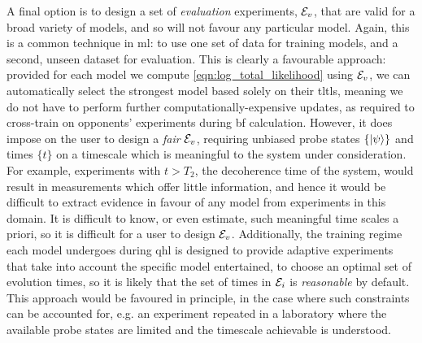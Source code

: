A final option is to design a set of \emph{evaluation} \glspl{experiment}, ${ \mathcal{E} }_v$, 
    that are valid for a broad variety of models, and so will not favour any particular model.
Again, this is a common technique in \gls{ml}: to use one set of data for training models, 
    and a second, unseen dataset for evaluation. 
This is clearly a favourable approach: 
    provided for each model we compute \cref{eqn:log_total_likelihood} using ${ \mathcal{E} }_v$,
    we can automatically select the strongest model based solely on their \glspl{tltl}, 
    meaning we do not have to perform further computationally-expensive updates, 
    as required to cross-train on opponents' 
    \glspl{experiment} during \gls{bf} calculation. 
However, it does impose on the user to design a \emph{fair} ${ \mathcal{E} }_v$, 
    requiring unbiased \gls{probe} states $\{\ket{\psi}\}$ and times $\{t\}$ on a timescale 
    which is meaningful to the system under consideration. 
For example, \glspl{experiment} with $t > T_2$, the decoherence time of the system, 
    would result in measurements which offer little information, 
    and hence it would be difficult to extract evidence in favour of any 
    model from \glspl{experiment} in this domain.
It is difficult to know, or even estimate, such meaningful time scales a priori,
    so it is difficult for a user to design ${ \mathcal{E} }_v$. 
Additionally, the training regime each model undergoes during \gls{qhl}
    is designed to provide adaptive \glspl{experiment} that take into account
    the specific model entertained, to choose an optimal set of evolution times, 
    so it is likely that the set of times in ${ \mathcal{E} }_i$ is \emph{reasonable} by default. 
This approach would be favoured in principle, in the case where such constraints can be accounted for,
    e.g. an \gls{experiment} repeated in a laboratory where the available 
    \gls{probe} states are limited and the timescale achievable is understood. 
     
